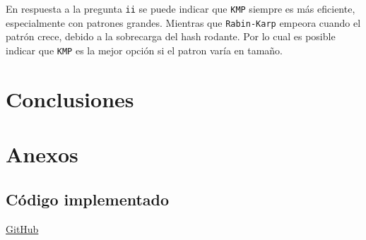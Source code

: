 \documentclass[12pt]{article}
\begin{document}
	En respuesta a la pregunta \texttt{ii} se puede indicar que \texttt{KMP} siempre es más eficiente, especialmente con patrones grandes. Mientras que \texttt{Rabin-Karp} empeora cuando el patrón crece, debido a la sobrecarga del hash rodante. Por lo cual es posible indicar que \texttt{KMP} es la mejor opción si el patron varía en tamaño.
	
	\section{Conclusiones}
	
	\section{Anexos}
	\subsection{Código implementado}
	\href{URL}{GitHub}
	
\end{document}
